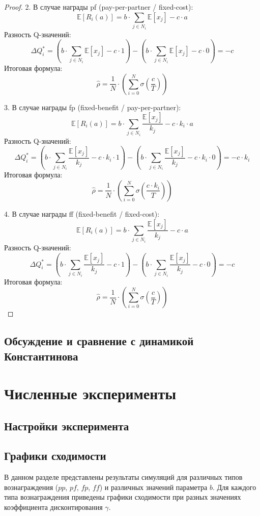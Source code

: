 \documentclass[a4paper, fontsize=14pt]{article}
\theoremstyle{plain}
\theoremstyle{definition}
\begin{document}
\begin{proof}
    
    2. В случае награды pf (pay-per-partner / fixed-cost):
    $$ \mathbb{E}[R_i(a)] = b \cdot \sum_{j \in N_i} \mathbb{E}[x_j] - c \cdot a $$
    Разность Q-значений:
    $$ \Delta Q_i^* = (b \cdot \sum_{j \in N_i} \mathbb{E}[x_j] - c \cdot 1)  - (b \cdot \sum_{j \in N_i} \mathbb{E}[x_j] - c \cdot 0) = - c $$
    Итоговая формула:
    $$\hat{\rho} = \frac{1}{N} \cdot \left( \sum_{i=0}^N \sigma\left(\frac{c}{T} \right)\right)$$
    
    
    3. В случае награды fp (fixed-benefit / pay-per-partner):
    $$ \mathbb{E}[R_i(a)] = b \cdot \sum_{j \in N_i} \frac{\mathbb{E}[x_j]}{k_j} - c \cdot k_i \cdot a $$
    Разность Q-значений:
    $$ \Delta Q_i^* = (b \cdot \sum_{j \in N_i} \frac{\mathbb{E}[x_j]}{k_j} - c \cdot k_i \cdot 1)  - (b \cdot \sum_{j \in N_i} \frac{\mathbb{E}[x_j]}{k_j} - c \cdot k_i \cdot 0) = - c \cdot k_i $$
    Итоговая формула:
    $$\hat{\rho} = \frac{1}{N} \cdot \left( \sum_{i=0}^N \sigma\left(\frac{c \cdot k_i}{T} \right)\right)$$
    
    
    4. В случае награды ff (fixed-benefit / fixed-cost):
    $$ \mathbb{E}[R_i(a)] = b \cdot \sum_{j \in N_i} \frac{\mathbb{E}[x_j]}{k_j} - c \cdot a $$
    Разность Q-значений:
    $$ \Delta Q_i^* = (b \cdot \sum_{j \in N_i} \frac{\mathbb{E}[x_j]}{k_j} - c \cdot 1)  - (b \cdot \sum_{j \in N_i} \frac{\mathbb{E}[x_j]}{k_j} - c \cdot 0) = - c $$
    Итоговая формула:
    $$\hat{\rho} = \frac{1}{N} \cdot \left( \sum_{i=0}^N \sigma\left(\frac{c}{T} \right)\right)$$
\end{proof}


\subsection{Обсуждение и сравнение с динамикой Константинова}

\section{Численные эксперименты}
\subsection{Настройки эксперимента}

\subsection{Графики сходимости}
В данном разделе представлены результаты симуляций для различных типов вознаграждения ($pp$, $pf$, $fp$, $ff$) и различных значений параметра $b$. Для каждого типа вознаграждения приведены графики сходимости при разных значениях коэффициента дисконтирования $\gamma$.
\end{document}
